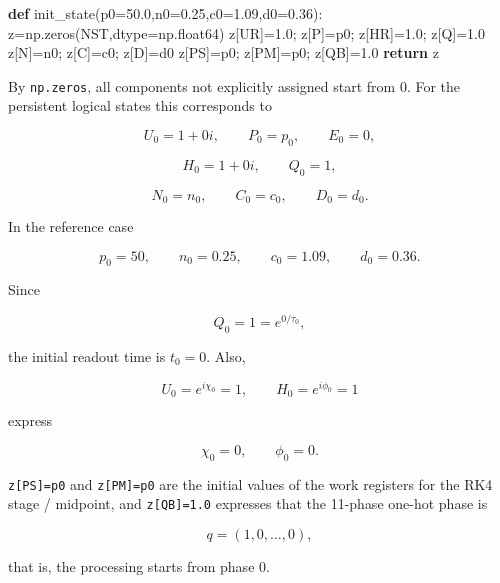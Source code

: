 \documentclass[
  a4paper,
]{article}
\newenvironment{Shaded}{}{}
\newcommand{\ControlFlowTok}[1]{\textcolor[rgb]{0.00,0.44,0.13}{\textbf{#1}}}
\newcommand{\FloatTok}[1]{\textcolor[rgb]{0.25,0.63,0.44}{#1}}
\newcommand{\KeywordTok}[1]{\textcolor[rgb]{0.00,0.44,0.13}{\textbf{#1}}}
\newcommand{\NormalTok}[1]{#1}
\newcommand{\OperatorTok}[1]{\textcolor[rgb]{0.40,0.40,0.40}{#1}}
\begin{document}
\begin{Shaded}
\begin{Highlighting}[]
\KeywordTok{def}\NormalTok{ init\_state(p0}\OperatorTok{=}\FloatTok{50.0}\NormalTok{,n0}\OperatorTok{=}\FloatTok{0.25}\NormalTok{,c0}\OperatorTok{=}\FloatTok{1.09}\NormalTok{,d0}\OperatorTok{=}\FloatTok{0.36}\NormalTok{):}
\NormalTok{    z}\OperatorTok{=}\NormalTok{np.zeros(NST,dtype}\OperatorTok{=}\NormalTok{np.float64)}
\NormalTok{    z[UR]}\OperatorTok{=}\FloatTok{1.0}\OperatorTok{;}\NormalTok{ z[P]}\OperatorTok{=}\NormalTok{p0}\OperatorTok{;}\NormalTok{ z[HR]}\OperatorTok{=}\FloatTok{1.0}\OperatorTok{;}\NormalTok{ z[Q]}\OperatorTok{=}\FloatTok{1.0}
\NormalTok{    z[N]}\OperatorTok{=}\NormalTok{n0}\OperatorTok{;}\NormalTok{ z[C]}\OperatorTok{=}\NormalTok{c0}\OperatorTok{;}\NormalTok{ z[D]}\OperatorTok{=}\NormalTok{d0}
\NormalTok{    z[PS]}\OperatorTok{=}\NormalTok{p0}\OperatorTok{;}\NormalTok{ z[PM]}\OperatorTok{=}\NormalTok{p0}\OperatorTok{;}\NormalTok{ z[QB]}\OperatorTok{=}\FloatTok{1.0}
    \ControlFlowTok{return}\NormalTok{ z}
\end{Highlighting}
\end{Shaded}

By \texttt{np.zeros}, all components not explicitly assigned start from
0. For the persistent logical states this corresponds to

\[
U_0=1+0i,
\qquad
P_0=p_0,
\qquad
E_0=0,
\]

\[
H_0=1+0i,
\qquad
Q_0=1,
\]

\[
N_0=n_0,
\qquad
C_0=c_0,
\qquad
D_0=d_0.
\]

In the reference case

\[
p_0=50,
\qquad
n_0=0.25,
\qquad
c_0=1.09,
\qquad
d_0=0.36.
\]

Since

\[
Q_0=1=e^{0/\tau_0},
\]

the initial readout time is \(t_0=0\). Also,

\[
U_0=e^{i\chi_0}=1,
\qquad
H_0=e^{i\phi_0}=1
\]

express

\[
\chi_0=0,
\qquad
\phi_0=0.
\]

\texttt{z{[}PS{]}=p0} and \texttt{z{[}PM{]}=p0} are the initial values
of the work registers for the RK4 stage / midpoint, and
\texttt{z{[}QB{]}=1.0} expresses that the 11-phase one-hot phase is

\[
q=(1,0,\ldots,0),
\]

that is, the processing starts from phase 0.
\end{document}
